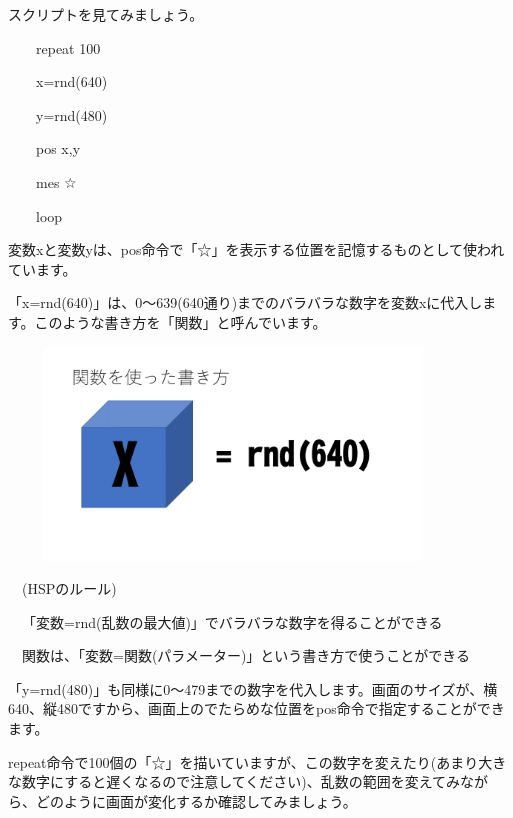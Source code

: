 \documentclass[a4paper,12pt]{jarticle}
\begin{document}
\bigskip
\bigskip
\bigskip

スクリプトを見てみましょう。

\bigskip

\ \ \ \ repeat 100

\ \ \ \ x=rnd(640)

\ \ \ \ y=rnd(480)

\ \ \ \ pos x,y

\ \ \ \ mes {\textquotedbl}☆{\textquotedbl}

\ \ \ \ loop

\bigskip

変数xと変数yは、pos命令で「☆」を表示する位置を記憶するものとして使われています。

「x=rnd(640)」は、0〜639(640通り)までのバラバラな数字を変数xに代入します。このような書き方を「関数」と呼んでいます。

\bigskip
\bigskip

\begin{minipage}{9.781cm}
\centering
{\upshape
\includegraphics[keepaspectratio,width=11.906cm,height=5.662cm]{text02-img/text02-img048.png}}
\end{minipage}

\bigskip
\bigskip
\bigskip

\ \ (HSPのルール)


\bigskip

\ \ 「変数=rnd(乱数の最大値)」でバラバラな数字を得ることができる

\ \ 関数は、「変数=関数(パラメーター)」という書き方で使うことができる

\bigskip

「y=rnd(480)」も同様に0〜479までの数字を代入します。画面のサイズが、横640、縦480ですから、画面上のでたらめな位置をpos命令で指定することができます。

repeat命令で100個の「☆」を描いていますが、この数字を変えたり(あまり大きな数字にすると遅くなるので注意してください)、乱数の範囲を変えてみながら、どのように画面が変化するか確認してみましょう。
\end{document}
